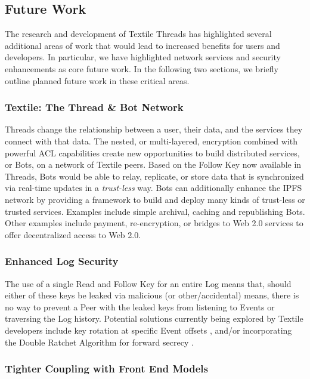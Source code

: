 \documentclass{textile}
\begin{document}
\subsection{Future Work}

The research and development of Textile Threads has highlighted several additional areas of work that would lead to increased benefits for users and developers. In particular, we have highlighted network services and security enhancements as core future work. In the following two sections, we briefly outline planned future work in these critical areas.

\subsubsection{Textile: The Thread \& Bot Network} \label{sec:Bots}

Threads change the relationship between a user, their data, and the services they connect with that data. The nested, or multi-layered, encryption combined with powerful ACL capabilities create new opportunities to build distributed services, or Bots, on a network of Textile peers. Based on the Follow Key now available in Threads, Bots would be able to relay, replicate, or store data that is synchronized via real-time updates in a \emph{trust-less} way. Bots can additionally enhance the IPFS network by providing a framework to build and deploy many kinds of trust-less or trusted services. Examples include simple archival, caching and republishing Bots. Other examples include payment, re-encryption, or bridges to Web 2.0 services to offer decentralized access to Web 2.0.

\subsubsection{Enhanced Log Security}

The use of a single Read and Follow Key for an entire Log means that, should either of these keys be leaked via malicious (or other/accidental) means, there is no way to prevent a Peer with the leaked keys from listening to Events or traversing the Log history. Potential solutions currently being explored by Textile developers include key rotation at specific Event offsets \cite{hashicorpKeyRotation}, and/or incorporating the Double Ratchet Algorithm \cite{marlinspikeDoubleRatchetAlgorithm2016} for forward secrecy \cite{ungerSoKSecureMessaging2015}.

\subsubsection{Tighter Coupling with Front End Models}\label{sec:coupling}
\end{document}
